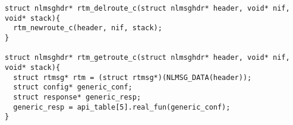 \begin{lstlisting}[style=CscriptStyle]
struct nlmsghdr* rtm_delroute_c(struct nlmsghdr* header, void* nif, void* stack){
  rtm_newroute_c(header, nif, stack);
}

struct nlmsghdr* rtm_getroute_c(struct nlmsghdr* header, void* nif, void* stack){
  struct rtmsg* rtm = (struct rtmsg*)(NLMSG_DATA(header));
  struct config* generic_conf;
  struct response* generic_resp;
  generic_resp = api_table[5].real_fun(generic_conf);
}

\end{lstlisting}
